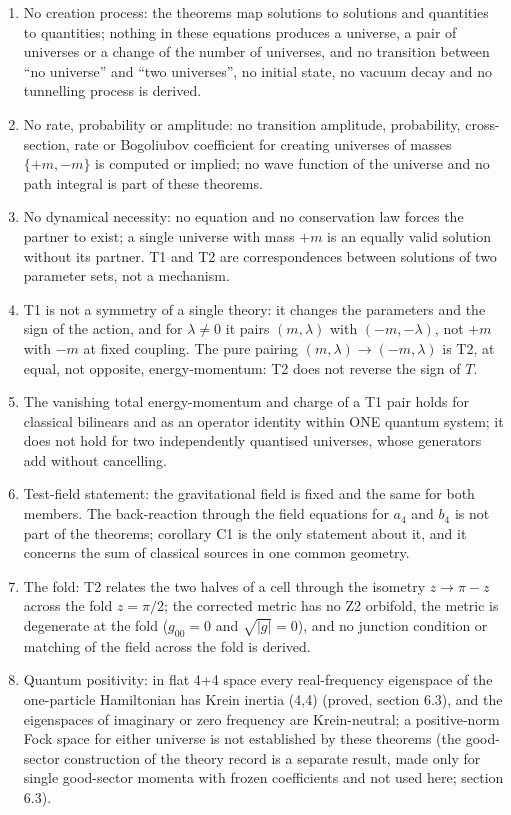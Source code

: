 \documentclass[11pt]{article}
\begin{document}
\begin{enumerate}
\item No creation process: the theorems map solutions to solutions and quantities to quantities; nothing in these equations produces a universe, a pair of universes or a change of the number of universes, and no transition between ``no universe'' and ``two universes'', no initial state, no vacuum decay and no tunnelling process is derived.
\item No rate, probability or amplitude: no transition amplitude, probability, cross-section, rate or Bogoliubov coefficient for creating universes of masses $\{+m, -m\}$ is computed or implied; no wave function of the universe and no path integral is part of these theorems.
\item No dynamical necessity: no equation and no conservation law forces the partner to exist; a single universe with mass $+m$ is an equally valid solution without its partner. T1 and T2 are correspondences between solutions of two parameter sets, not a mechanism.
\item T1 is not a symmetry of a single theory: it changes the parameters and the sign of the action, and for $\lambda \neq 0$ it pairs $(m,\lambda)$ with $(-m,-\lambda)$, not $+m$ with $-m$ at fixed coupling. The pure pairing $(m,\lambda) \to (-m,\lambda)$ is T2, at equal, not opposite, energy-momentum: T2 does not reverse the sign of $T$.
\item The vanishing total energy-momentum and charge of a T1 pair holds for classical bilinears and as an operator identity within ONE quantum system; it does not hold for two independently quantised universes, whose generators add without cancelling.
\item Test-field statement: the gravitational field is fixed and the same for both members. The back-reaction through the field equations for $a_4$ and $b_4$ is not part of the theorems; corollary C1 is the only statement about it, and it concerns the sum of classical sources in one common geometry.
\item The fold: T2 relates the two halves of a cell through the isometry $z \to \pi - z$ across the fold $z = \pi/2$; the corrected metric has no Z2 orbifold, the metric is degenerate at the fold ($g_{00} = 0$ and $\sqrt{|g|} = 0$), and no junction condition or matching of the field across the fold is derived.
\item Quantum positivity: in flat 4+4 space every real-frequency eigenspace of the one-particle Hamiltonian has Krein inertia (4,4) (proved, section 6.3), and the eigenspaces of imaginary or zero frequency are Krein-neutral; a positive-norm Fock space for either universe is not established by these theorems (the good-sector construction of the theory record is a separate result, made only for single good-sector momenta with frozen coefficients and not used here; section 6.3).

\end{enumerate}
\end{document}
